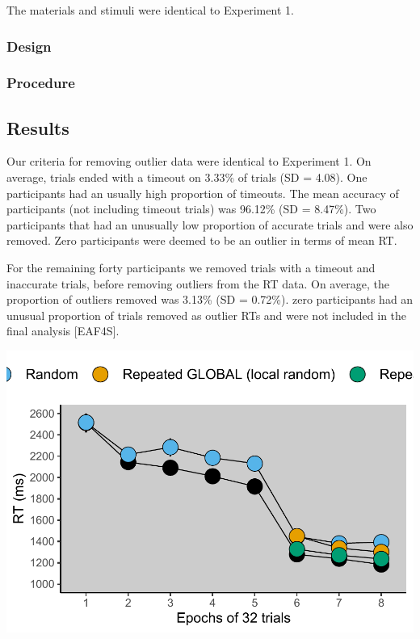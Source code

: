 \documentclass[
  man]{apa7}
\begin{document}
The materials and stimuli were identical to Experiment 1.

\hypertarget{design-2}{%
\subsubsection{Design}\label{design-2}}

\hypertarget{procedure-2}{%
\subsubsection{Procedure}\label{procedure-2}}

\hypertarget{results-2}{%
\subsection{Results}\label{results-2}}

Our criteria for removing outlier data were identical to Experiment 1. On average, trials ended with a timeout on 3.33\% of trials (SD = 4.08). One participants had an usually high proportion of timeouts. The mean accuracy of participants (not including timeout trials) was 96.12\% (SD = 8.47\%). Two participants that had an unusually low proportion of accurate trials and were also removed. Zero participants were deemed to be an outlier in terms of mean RT.

For the remaining forty participants we removed trials with a timeout and inaccurate trials, before removing outliers from the RT data. On average, the proportion of outliers removed was 3.13\% (SD = 0.72\%). zero participants had an unusual proportion of trials removed as outlier RTs and were not included in the final analysis {[}EAF4S{]}.

\includegraphics{CCC_ms1_files/figure-latex/Exp3-RT-figure-1.pdf}
\end{document}
